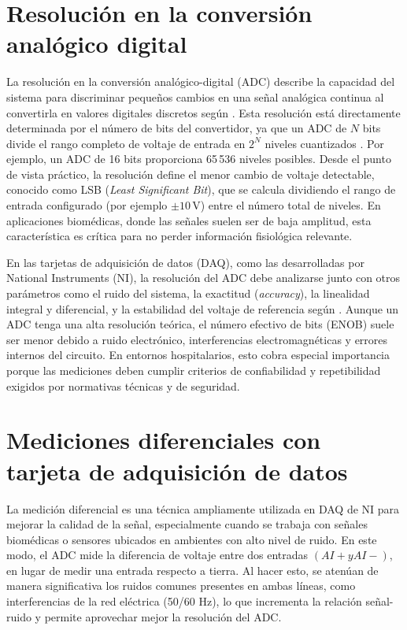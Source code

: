 \section*{Resolución en la conversión analógico digital}

La resolución en la conversión analógico-digital (ADC) describe la capacidad del sistema para discriminar pequeños cambios en una señal analógica continua al convertirla en valores digitales discretos según \cite{NIResolutionDAQ}. Esta resolución está directamente determinada por el número de bits del convertidor, ya que un ADC de $N$ bits divide el rango completo de voltaje de entrada en $2^N$ niveles cuantizados \cite{LibreTextsADC}. Por ejemplo, un ADC de 16 bits proporciona 65\,536 niveles posibles. Desde el punto de vista práctico, la resolución define el menor cambio de voltaje detectable, conocido como LSB (\textit{Least Significant Bit}), que se calcula dividiendo el rango de entrada configurado (por ejemplo $\pm 10$\,V) entre el número total de niveles. En aplicaciones biomédicas, donde las señales suelen ser de baja amplitud, esta característica es crítica para no perder información fisiológica relevante.

En las tarjetas de adquisición de datos (DAQ), como las desarrolladas por National Instruments (NI), la resolución del ADC debe analizarse junto con otros parámetros como el ruido del sistema, la exactitud (\textit{accuracy}), la linealidad integral y diferencial, y la estabilidad del voltaje de referencia según \cite{ADLINKDAQ}. Aunque un ADC tenga una alta resolución teórica, el número efectivo de bits (ENOB) suele ser menor debido a ruido electrónico, interferencias electromagnéticas y errores internos del circuito. En entornos hospitalarios, esto cobra especial importancia porque las mediciones deben cumplir criterios de confiabilidad y repetibilidad exigidos por normativas técnicas y de seguridad.

\section*{Mediciones diferenciales con tarjeta de adquisición de datos}

La medición diferencial es una técnica ampliamente utilizada en DAQ de NI para mejorar la calidad de la señal, especialmente cuando se trabaja con señales biomédicas o sensores ubicados en ambientes con alto nivel de ruido. En este modo, el ADC mide la diferencia de voltaje entre dos entradas $(AI+ y AI-)$, en lugar de medir una entrada respecto a tierra. Al hacer esto, se atenúan de manera significativa los ruidos comunes presentes en ambas líneas, como interferencias de la red eléctrica (50/60 Hz), lo que incrementa la relación señal-ruido y permite aprovechar mejor la resolución del ADC.

